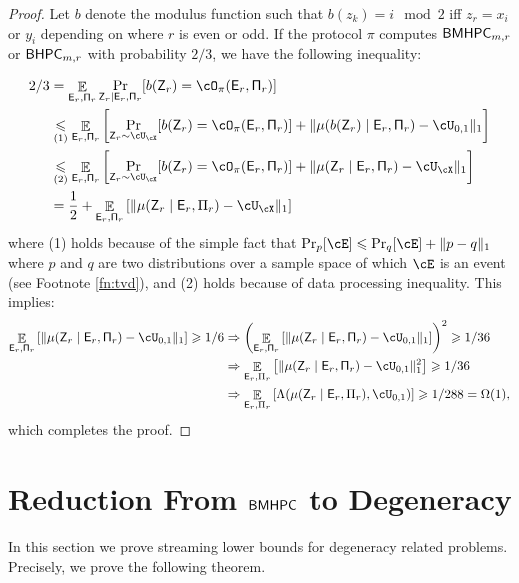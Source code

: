 \documentclass[11pt,letterpaper]{article}
\DeclareMathOperator*{\E}{\mathbb{E}}
\renewcommand{\geq}{\geqslant}
\renewcommand{\leq}{\leqslant}
\theoremstyle{definition}
\newcommand{\rPi}{\rv{\Pi}}
\newcommand{\bhpc}{\ensuremath{\textnormal{\textsf{BHPC}}}\xspace}
\newcommand{\bmhpc}{\ensuremath{\textnormal{\textsf{BMHPC}}}\xspace}
\newcommand{\rv}[1]{\ensuremath{\mathsf{#1}}}
\newcommand{\rZ}{\rv{Z}}
\newcommand{\rE}{\rv{E}}
\begin{document}
\begin{proof}
    
 Let $b$ denote the modulus function such that $b(z_k) = i \mod 2$ iff $z_r = x_i$ or $y_i$ depending on where $r$ is even or odd. If the protocol $\pi$ computes $\bmhpc_{m,r}$ or $\bhpc_{m,r}$ with probability $2/3$, we have the following inequality:

 \begin{align*}
     2/3 &= \E_{\rE_r,\rPi_r} \Pr_{\rZ_r \mid \rE_r,\rPi_r} [b(\rZ_r) =
     \cO_\pi(\rE_r,\rPi_r)]\\
     &\underset{(1)}\leq \E_{\rE_r,\rPi_r}\left[\Pr_{\rZ_r \sim
     \cU_{\cX}}[b(\rZ_r) = \cO_\pi(\rE_r,\rPi_r)] + \|\mu(b(\rZ_r) \mid \rE_r,\rPi_r) - \cU_{0,1}\|_1 \right]\\
     &\underset{(2)}\leq \E_{\rE_r,\rPi_r}\left[\Pr_{\rZ_r \sim
     \cU_{\cX}}[b(\rZ_r) = \cO_\pi(\rE_r,\rPi_r)] + \|\mu(\rZ_r \mid \rE_r,\rPi_r) - \cU_\cX\|_1 \right]\\
     &= \frac 1 2 + \E_{\rE_r,\rPi_r}\left[\|\mu(\rZ_r \mid \rE_r,\Pi_r) - \cU_\cX\|_1 \right]
 \end{align*}
 where (1) holds because of the simple fact that $\Pr_p[\cE] \leq \Pr_q[\cE] + \|p-q\|_1$ where $p$ and $q$ are two distributions over a sample space of which $\cE$ is an event (see Footnote \ref{fn:tvd}), and (2) holds because of data processing inequality. This implies:
 \begin{align*}
     \E_{\rE_r,\rPi_r}\left[\|\mu(\rZ_r \mid \rE_r,\rPi_r) - \cU_{0,1}\|_1
     \right] \geq 1/6 &\Rightarrow \left(\E_{\rE_r,\rPi_r}\left[\|\mu(\rZ_r \mid
     \rE_r,\rPi_r) - \cU_{0,1}\|_1 \right] \right)^2\geq 1/36\\
     &\Rightarrow \E_{\rE_r,\Pi_r}\left[\|\mu(\rZ_r \mid \rE_r,\rPi_r) -
     \cU_{0,1}\|_1^2 \right] \geq 1/36\\
     &\Rightarrow \E_{\rE_r,\Pi_r}
     \left[\Lambda(\mu(\rZ_r \mid \rE_r,\Pi_r), \cU_{0,1}) \right]
     \geq 1/288 = \Omega(1),
 \end{align*}
 which completes the proof.
\end{proof}




\section{Reduction From \bmhpc to Degeneracy}\label{sec:reduction}

In this section we prove streaming lower bounds for degeneracy related problems. Precisely, we prove the following theorem. 
\end{document}
